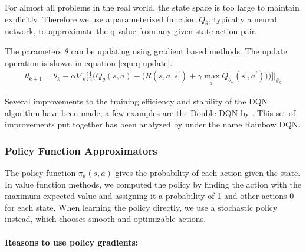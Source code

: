For almost all problems in the real world, the state space is too large to maintain explicitly. Therefore we use a parameterized function $Q_{\theta}$, typically a neural network, to approximate the q-value from any given state-action pair.

The parameters $\theta$ can be updating using gradient based methods. The update operation is shown in equation \ref{eqn:q-update}.
\begin{equation}
    \label{eqn:q-update}
    \begin{split}
        \theta_{k+1} = \theta_k - \alpha \nabla_\theta \Bigg[\frac{1}{2} \bigg(Q_\theta(s, a) - \Big(R(s, a, s^\prime) + \gamma \max_{a^\prime} Q_{\theta_k}(s^\prime, a^\prime)  \Big) \bigg) \Bigg] \Bigg\vert_{\theta_k}
    \end{split}
\end{equation}

Several improvements to the training efficiency and stability of the DQN algorithm have been made; a few examples are the Double DQN by \cite{double-dqn}. This set of improvements put together has been analyzed by \cite{rainbow-dqn} under the name Rainbow DQN.

\subsubsection{Policy Function Approximators}

The policy function $\pi_\theta(s, a)$ gives the probability of each action given the state. In value function methods, we computed the policy by finding the action with the maximum expected value and assigning it a probability of 1 and other actions 0 for each state. When learning the policy directly, we use a stochastic policy instead, which chooses smooth and optimizable actions.

\paragraph{Reasons to use policy gradients:}

